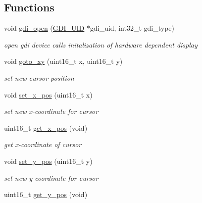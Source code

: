 \subsection*{Functions}
\begin{CompactItemize}
\item 
\hypertarget{group__hgdi__api_g9ae06ae1c0c5f79d3f1c69f7052754ce}{
void \hyperlink{group__hgdi__api_g9ae06ae1c0c5f79d3f1c69f7052754ce}{gdi\_\-open} (\hyperlink{group__hgdi__api_g45f1f4ec61f7d1369d94ffba402c6adb}{GDI\_\-UID} $\ast$gdi\_\-uid, int32\_\-t gdi\_\-type)}
\label{group__hgdi__api_g9ae06ae1c0c5f79d3f1c69f7052754ce}

\begin{CompactList}\small\item\em open gdi device calls initalization of hardware dependent display \item\end{CompactList}\item 
void \hyperlink{group__hgdi__api_g7601be835bcebe7b3cdde530f1eee8ae}{goto\_\-xy} (uint16\_\-t x, uint16\_\-t y)
\begin{CompactList}\small\item\em set new cursor position \item\end{CompactList}\item 
void \hyperlink{group__hgdi__api_g8d443553cf6cc32ecaffc97696150b03}{set\_\-x\_\-pos} (uint16\_\-t x)
\begin{CompactList}\small\item\em set new x-coordinate for cursor \item\end{CompactList}\item 
uint16\_\-t \hyperlink{group__hgdi__api_g7e9d358d7d7d5d19b78da9ca5c630fce}{get\_\-x\_\-pos} (void)
\begin{CompactList}\small\item\em get x-coordinate of cursor \item\end{CompactList}\item 
void \hyperlink{group__hgdi__api_ge36f0ada44131f77cd99aac2e1945cc4}{set\_\-y\_\-pos} (uint16\_\-t y)
\begin{CompactList}\small\item\em set new y-coordinate for cursor \item\end{CompactList}\item 
uint16\_\-t \hyperlink{group__hgdi__api_g0237f5d1affe3493f0f428a66d7d1290}{get\_\-y\_\-pos} (void)

\end{CompactItemize}
